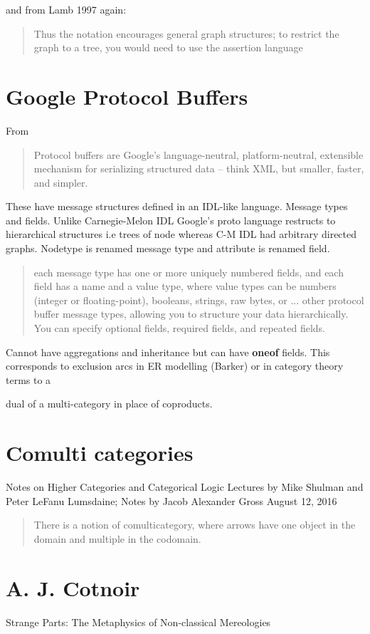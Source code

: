 \documentclass[10pt,a4paper]{scrartcl}
\begin{document}
and from Lamb 1997 again:
\begin{quote}
Thus the notation encourages general graph structures; to restrict the graph to a tree, you
would need to use the assertion language
\end{quote}

\section{Google Protocol Buffers}
From 
\begin{quote}
Protocol buffers are Google's language-neutral, platform-neutral, extensible mechanism for serializing structured data – think XML, but smaller, faster, and simpler. 
\end{quote}

These have message structures defined in an IDL-like language. Message types and fields. Unlike Carnegie-Melon IDL Google's proto language restructs to
hierarchical structures i.e trees of node whereas C-M IDL had arbitrary directed graphs. Nodetype is renamed message type and attribute is renamed field.

\begin{quote}
each message type has one or more uniquely numbered fields, and each field has a name and a value type, where value types can be numbers (integer or floating-point), booleans, strings, raw bytes, or ... other protocol buffer message types, allowing you to structure your data hierarchically. You can specify optional fields, required fields, and repeated fields.
\end{quote}
Cannot have aggregations and inheritance but can have \textbf{oneof} fields. This corresponds to exclusion arcs in ER modelling (Barker) or in category theory terms to a 

dual of a multi-category in place of coproducts. 

\section{Comulti categories}
Notes on Higher Categories and Categorical Logic
Lectures by Mike Shulman and Peter LeFanu Lumsdaine;
Notes by Jacob Alexander Gross
August 12, 2016
\begin{quote}
There is a notion of comulticategory, where
arrows have one object in the domain and multiple in the codomain. 
\end{quote}

\section{A. J. Cotnoir}
Strange Parts: The Metaphysics of Non-classical Mereologies
\end{document}
